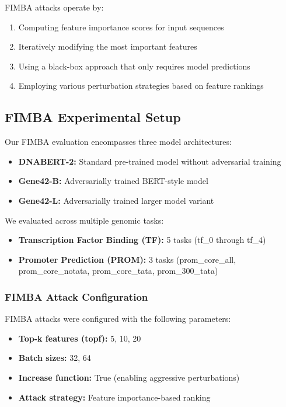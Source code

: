 \documentclass{article} %
\begin{document}
FIMBA attacks operate by:
\begin{enumerate}
    \item Computing feature importance scores for input sequences
    \item Iteratively modifying the most important features
    \item Using a black-box approach that only requires model predictions
    \item Employing various perturbation strategies based on feature rankings
\end{enumerate}

\subsection{FIMBA Experimental Setup}

Our FIMBA evaluation encompasses three model architectures:
\begin{itemize}
    \item \textbf{DNABERT-2:} Standard pre-trained model without adversarial training
    \item \textbf{Gene42-B:} Adversarially trained BERT-style model
    \item \textbf{Gene42-L:} Adversarially trained larger model variant
\end{itemize}

We evaluated across multiple genomic tasks:
\begin{itemize}
    \item \textbf{Transcription Factor Binding (TF):} 5 tasks (tf\_0 through tf\_4)
    \item \textbf{Promoter Prediction (PROM):} 3 tasks (prom\_core\_all, prom\_core\_notata, prom\_core\_tata, prom\_300\_tata)
\end{itemize}

\subsubsection{FIMBA Attack Configuration}

FIMBA attacks were configured with the following parameters:
\begin{itemize}
    \item \textbf{Top-k features (topf):} 5, 10, 20
    \item \textbf{Batch sizes:} 32, 64
    \item \textbf{Increase function:} True (enabling aggressive perturbations)
    \item \textbf{Attack strategy:} Feature importance-based ranking
\end{itemize}
\end{document}
